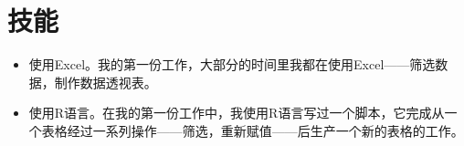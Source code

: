 \section{技能}
\begin{itemize}
	\item 使用Excel。我的第一份工作，大部分的时间里我都在使用Excel——筛选数据，制作数据透视表。
	\item 使用R语言。在我的第一份工作中，我使用R语言写过一个脚本，它完成从一个表格经过一系列操作——筛选，重新赋值——后生产一个新的表格的工作。
\end{itemize}
